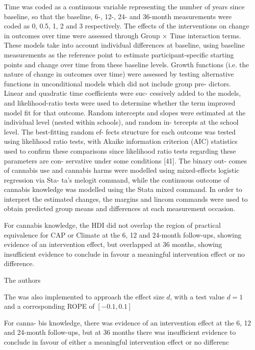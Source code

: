 Time was coded as a continuous variable representing the number of years since baseline,
so that the baseline, 6-, 12-, 24- and 36-month measurements were coded as 0, 0.5, 1, 2 and 3 respectively. The effects of the interventions on change in outcomes over
time were assessed through Group × Time interaction
terms. These models take into account individual differences 
at baseline, using baseline measurements as the
reference point to estimate participant-specific starting
points and change over time from these baseline levels.
Growth functions (i.e. the nature of change in outcomes
over time) were assessed by testing alternative functions
in unconditional models which did not include group pre-
dictors. Linear and quadratic time coefficients were suc-
cessively added to the models, and likelihood-ratio tests
were used to determine whether the term improved model
fit for that outcome.
Random intercepts and slopes were estimated at the
individual level (nested within schools), and random in-
tercepts at the school level. The best-fitting random ef-
fects structure for each outcome was tested using
likelihood ratio tests, with Akaike information criterion
(AIC) statistics used to confirm these comparisons since
likelihood ratio tests regarding these parameters are con-
servative under some conditions [41]. The binary out-
comes of cannabis use and cannabis harms were
modelled using mixed-effects logistic regression via Sta-
ta’s melogit command, while the continuous outcome of
cannabis knowledge was modelled using the Stata mixed
command. In order to interpret the estimated
changes, the margins and lincom commands were used
to obtain predicted group means and differences at each
measurement occasion.


 For cannabis knowledge, the HDI did not overlap the region of practical equivalence for CAP or Climate at the 6, 12 and 24-month follow-ups, showing evidence of an intervention effect, but overlapped at 36 months, showing insufficient evidence to conclude in favour a meaningful intervention effect or no difference.

The authors 

The \hdr{} was also implemented to approach the effect size $d$, with a test value $d=1$ and a corresponding ROPE of $[-0.1,0.1]$
\

 For canna-
bis knowledge, there was evidence of an intervention effect
at the 6, 12 and 24-month follow-ups, but at 36 months
there was insufficient evidence to conclude in favour of
either a meaningful intervention effect or no differenc
